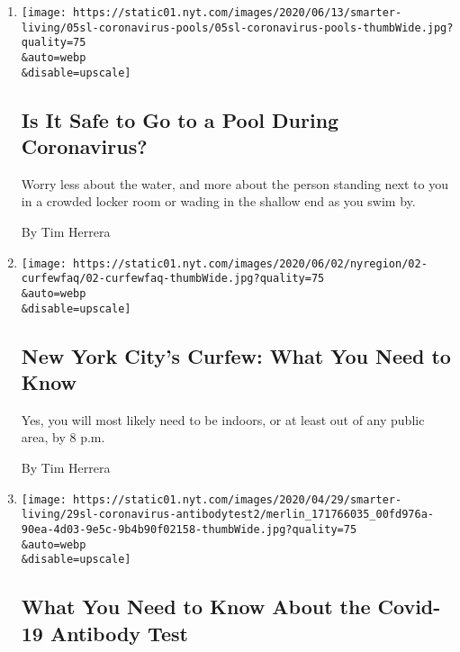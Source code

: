 \begin{enumerate}
\def\labelenumi{\arabic{enumi}.}
\item
  \href{/2020/06/05/smarter-living/coronavirus-swimming-pool-water.html}{}

  \texttt{[image: https://static01.nyt.com/images/2020/06/13/smarter-living/05sl-coronavirus-pools/05sl-coronavirus-pools-thumbWide.jpg?quality=75\\\&auto=webp\\\&disable=upscale]}

  \hypertarget{is-it-safe-to-go-to-a-pool-during-coronavirus}{%
  \subsection{Is It Safe to Go to a Pool During
  Coronavirus?}\label{is-it-safe-to-go-to-a-pool-during-coronavirus}}

  Worry less about the water, and more about the person standing next to
  you in a crowded locker room or wading in the shallow end as you swim
  by.

  By Tim Herrera
\item
  \href{/article/nyc-curfew.html}{}

  \texttt{[image: https://static01.nyt.com/images/2020/06/02/nyregion/02-curfewfaq/02-curfewfaq-thumbWide.jpg?quality=75\\\&auto=webp\\\&disable=upscale]}

  \hypertarget{new-york-citys-curfew-what-you-need-to-know}{%
  \subsection{New York City's Curfew: What You Need to
  Know}\label{new-york-citys-curfew-what-you-need-to-know}}

  Yes, you will most likely need to be indoors, or at least out of any
  public area, by 8 p.m.

  By Tim Herrera
\item
  \href{/article/antibody-test-coronavirus.html}{}

  \texttt{[image: https://static01.nyt.com/images/2020/04/29/smarter-living/29sl-coronavirus-antibodytest2/merlin\_171766035\_00fd976a-90ea-4d03-9e5c-9b4b90f02158-thumbWide.jpg?quality=75\\\&auto=webp\\\&disable=upscale]}

  \hypertarget{what-you-need-to-know-about-the-covid-19-antibody-test}{%
  \subsection{What You Need to Know About the Covid-19 Antibody
  Test}\label{what-you-need-to-know-about-the-covid-19-antibody-test}}


\end{enumerate}
